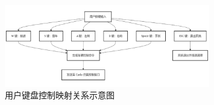\begin{figure}[H]
    \centering
    \includegraphics[width=0.8\textwidth]{images/图16 用户键盘控制映射关系示意图.pdf}  %
    \caption{用户键盘控制映射关系示意图}
    \label{fig:example_image}  %
\end{figure}


\begin{tabular}{l l}
\end{tabular}